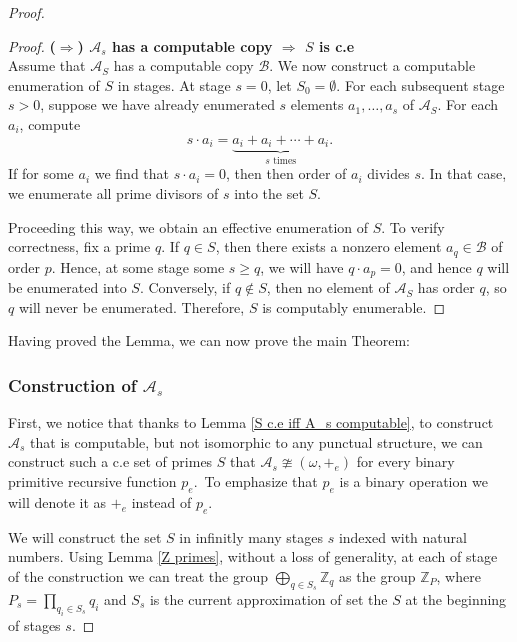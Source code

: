 \documentclass{pracalicmgr2025}
\theoremstyle{plain}            %
\theoremstyle{remark}           %
\theoremstyle{definition}       %
\begin{document}
\begin{proof}
\begin{proof}
\bigskip
\noindent\textbf{($\Rightarrow$) $\mathcal{A}_s$ has a computable copy $\Rightarrow$ $S$ is c.e}
\\

Assume that $\mathcal{A}_S$ has a computable copy $\mathcal{B}$. We now construct a computable enumeration of $S$ in stages. At stage $s = 0$, let $S_0 = \emptyset$. For each subsequent stage $s > 0$, suppose we have already enumerated $s$ elements $a_1, \dots, a_s$ of $\mathcal{A}_S$. For each $a_i$, compute 
$$
s \cdot a_i = \underbrace{a_i + a_i + \cdots + a_i}_{s \text{ times}}.
$$
If for some $a_i$ we find that $s \cdot a_i = 0$, then then order of $a_i$ divides $s$. In that case, we enumerate all prime divisors of $s$ into the set $S$.


Proceeding this way, we obtain an effective enumeration of $S$. To verify correctness, fix a prime $q$. If $q \in S$, then there exists a nonzero element $a_q \in \mathcal{B}$ of order $p$. Hence, at some stage some $s \ge q$, we will have $q \cdot a_p = 0$, and hence $q$ will be enumerated into $S$. Conversely, if $q \notin S$, then no element of $\mathcal{A}_S$ has order $q$, so $q$ will never be enumerated. Therefore, $S$ is computably enumerable.
 

\end{proof}

Having proved the Lemma, we can now prove the main Theorem:

\subsubsection{Construction of $\mathcal{A}_s$}

First, we notice that thanks to Lemma \ref{S c.e iff A_s computable}, to construct $\mathcal{A}_s$ that is computable, but not isomorphic to any punctual structure, we can construct such a c.e set of primes $S$ that $\mathcal{A}_s \ncong (\omega,+_e)$ for every binary primitive recursive function $p_e$.\ To emphasize that $p_e$ is a binary operation we will denote it as $+_e$ instead of $p_e$. 


We will construct the set $S$ in infinitly many stages $s$ indexed with natural numbers. Using Lemma \ref{Z primes}, without a loss of generality, at each of stage of the construction we can treat the group $\bigoplus_{q\in S_s} \mathbb{Z}_q$ as the group $\mathbb{Z}_{P}$, where $P_s = \prod_{q_i \in S_s} q_i$ and $S_s$ is the current approximation of set the $S$ at the beginning of stages $s$.



\end{proof}
\end{document}
